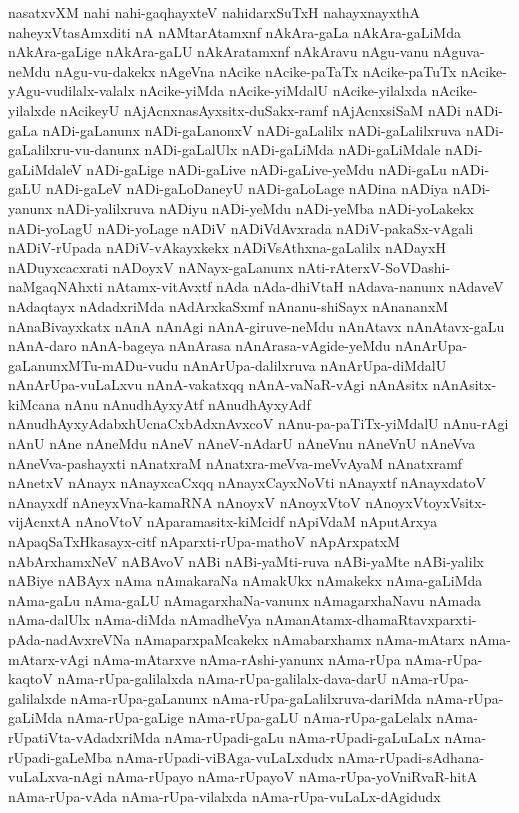 {nasatxvXM
nahi
nahi-gaqhayxteV
nahidarxSuTxH
nahayxnayxthA
naheyxVtasAmxditi
nA
nAMtarAtamxnf
nAkAra-gaLa
nAkAra-gaLiMda
nAkAra-gaLige
nAkAra-gaLU
nAkAratamxnf
nAkAravu
nAgu-vanu
nAguva-neMdu
nAgu-vu-dakekx
nAgeVna
nAcike
nAcike-paTaTx
nAcike-paTuTx
nAcike-yAgu-vudilalx-valalx
nAcike-yiMda
nAcike-yiMdalU
nAcike-yilalxda
nAcike-yilalxde
nAcikeyU
nAjAcnxnasAyxsitx-duSakx-ramf
nAjAcnxsiSaM
nADi
nADi-gaLa
nADi-gaLanunx
nADi-gaLanonxV
nADi-gaLalilx
nADi-gaLalilxruva
nADi-gaLalilxru-vu-danunx
nADi-gaLalUlx
nADi-gaLiMda
nADi-gaLiMdale
nADi-gaLiMdaleV
nADi-gaLige
nADi-gaLive
nADi-gaLive-yeMdu
nADi-gaLu
nADi-gaLU
nADi-gaLeV
nADi-gaLoDaneyU
nADi-gaLoLage
nADina
nADiya
nADi-yanunx
nADi-yalilxruva
nADiyu
nADi-yeMdu
nADi-yeMba
nADi-yoLakekx
nADi-yoLagU
nADi-yoLage
nADiV
nADiVdAvxrada
nADiV-pakaSx-vAgali
nADiV-rUpada
nADiV-vAkayxkekx
nADiVsAthxna-gaLalilx
nADayxH
nADuyxcacxrati
nADoyxV
nANayx-gaLanunx
nAti-rAterxV-SoVDashi-naMgaqNAhxti
nAtamx-vitAvxtf
nAda
nAda-dhiVtaH
nAdava-nanunx
nAdaveV
nAdaqtayx
nAdadxriMda
nAdArxkaSxmf
nAnanu-shiSayx
nAnananxM
nAnaBivayxkatx
nAnA
nAnAgi
nAnA-giruve-neMdu
nAnAtavx
nAnAtavx-gaLu
nAnA-daro
nAnA-bageya
nAnArasa
nAnArasa-vAgide-yeMdu
nAnArUpa-gaLanunxMTu-mADu-vudu
nAnArUpa-dalilxruva
nAnArUpa-diMdalU
nAnArUpa-vuLaLxvu
nAnA-vakatxqq
nAnA-vaNaR-vAgi
nAnAsitx
nAnAsitx-kiMcana
nAnu
nAnudhAyxyAtf
nAnudhAyxyAdf
nAnudhAyxyAdabxhUcnaCxbAdxnAvxcoV
nAnu-pa-paTiTx-yiMdalU
nAnu-rAgi
nAnU
nAne
nAneMdu
nAneV
nAneV-nAdarU
nAneVnu
nAneVnU
nAneVva
nAneVva-pashayxti
nAnatxraM
nAnatxra-meVva-meVvAyaM
nAnatxramf
nAnetxV
nAnayx
nAnayxcaCxqq
nAnayxCayxNoVti
nAnayxtf
nAnayxdatoV
nAnayxdf
nAneyxVna-kamaRNA
nAnoyxV
nAnoyxVtoV
nAnoyxVtoyxVsitx-vijAcnxtA
nAnoVtoV
nAparamasitx-kiMcidf
nApiVdaM
nAputArxya
nApaqSaTxHkasayx-citf
nAparxti-rUpa-mathoV
nApArxpatxM
nAbArxhamxNeV
nABAvoV
nABi
nABi-yaMti-ruva
nABi-yaMte
nABi-yalilx
nABiye
nABAyx
nAma
nAmakaraNa
nAmakUkx
nAmakekx
nAma-gaLiMda
nAma-gaLu
nAma-gaLU
nAmagarxhaNa-vanunx
nAmagarxhaNavu
nAmada
nAma-dalUlx
nAma-diMda
nAmadheVya
nAmanAtamx-dhamaRtavxparxti-pAda-nadAvxreVNa
nAmaparxpaMcakekx
nAmabarxhamx
nAma-mAtarx
nAma-mAtarx-vAgi
nAma-mAtarxve
nAma-rAshi-yanunx
nAma-rUpa
nAma-rUpa-kaqtoV
nAma-rUpa-galilalxda
nAma-rUpa-galilalx-dava-darU
nAma-rUpa-galilalxde
nAma-rUpa-gaLanunx
nAma-rUpa-gaLalilxruva-dariMda
nAma-rUpa-gaLiMda
nAma-rUpa-gaLige
nAma-rUpa-gaLU
nAma-rUpa-gaLelalx
nAma-rUpatiVta-vAdadxriMda
nAma-rUpadi-gaLu
nAma-rUpadi-gaLuLaLx
nAma-rUpadi-gaLeMba
nAma-rUpadi-viBAga-vuLaLxdudx
nAma-rUpadi-sAdhana-vuLaLxva-nAgi
nAma-rUpayo
nAma-rUpayoV
nAma-rUpa-yoVniRvaR-hitA
nAma-rUpa-vAda
nAma-rUpa-vilalxda
nAma-rUpa-vuLaLx-dAgidudx
}
